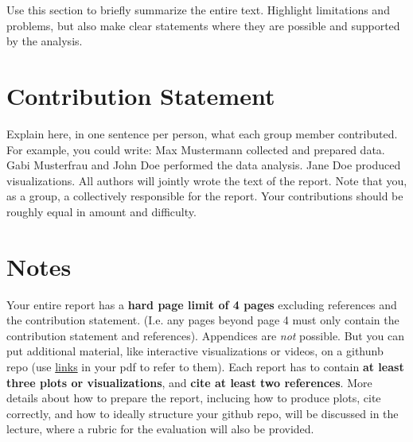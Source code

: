 Use this section to briefly summarize the entire text. Highlight limitations and problems, but also make clear statements where they are possible and supported by the analysis. 

\newpage

\section*{Contribution Statement}
Explain here, in one sentence per person, what each group member contributed. For example, you could write: Max Mustermann collected and prepared data. Gabi Musterfrau and John Doe performed the data analysis. Jane Doe produced visualizations. All authors will jointly wrote the text of the report. Note that you, as a group, a collectively responsible for the report. Your contributions should be roughly equal in amount and difficulty.

\section*{Notes} 

Your entire report has a \textbf{hard page limit of 4 pages} excluding references and the contribution statement. (I.e. any pages beyond page 4 must only contain the contribution statement and references). Appendices are \emph{not} possible. But you can put additional material, like interactive visualizations or videos, on a githunb repo (use \href{https://github.com/pnkraemer/tueplots}{links} in your pdf to refer to them). Each report has to contain \textbf{at least three plots or visualizations}, and \textbf{cite at least two references}. More details about how to prepare the report, inclucing how to produce plots, cite correctly, and how to ideally structure your github repo, will be discussed in the lecture, where a rubric for the evaluation will also be provided.